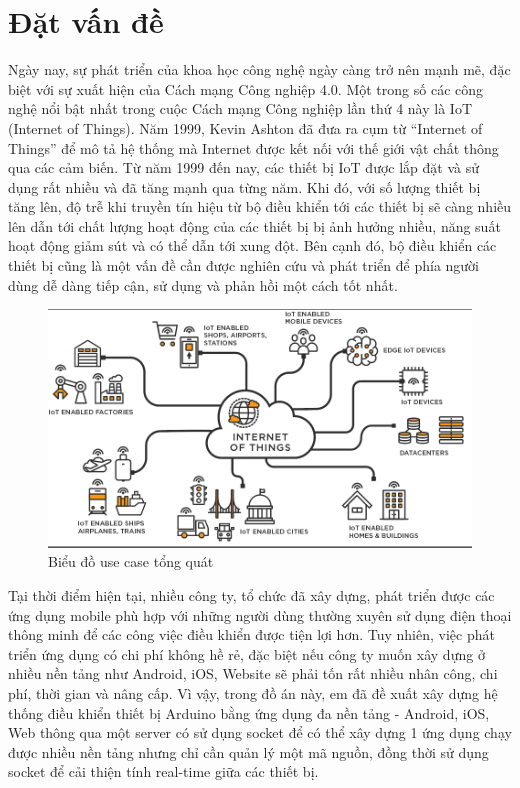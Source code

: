 \documentclass[../DoAn.tex]{subfiles}
\begin{document}
\section{Đặt vấn đề}
\label{section:1.1}

Ngày nay, sự phát triển của khoa học công nghệ ngày càng trở nên mạnh mẽ, đặc biệt với sự xuất hiện của Cách mạng Công nghiệp 4.0. Một trong số các công nghệ nổi bật nhất trong cuộc Cách mạng Công nghiệp lần thứ 4 này là IoT (Internet of Things). Năm 1999, Kevin Ashton \cite{KevinAshton} đã đưa ra cụm từ “Internet of Things” để mô tả hệ thống mà Internet được kết nối với thế giới vật chất thông qua các cảm biến. Từ năm 1999 đến nay, các thiết bị IoT được lắp đặt và sử dụng rất nhiều và đã tăng mạnh qua từng năm. Khi đó, với số lượng thiết bị tăng lên, độ trễ khi truyền tín hiệu từ bộ điều khiển tới các thiết bị sẽ càng nhiều lên dẫn tới chất lượng hoạt động của các thiết bị bị ảnh hưởng nhiều, năng suất hoạt động giảm sút và có thể dẫn tới xung đột. Bên cạnh đó, bộ điều khiển các thiết bị cũng là một vấn đề cần được nghiên cứu và phát triển để phía người dùng dễ dàng tiếp cận, sử dụng và phản hồi một cách tốt nhất. 

\begin{figure}[H]
    \includegraphics[width=0.9\linewidth]{Hinhve/IoT.png}
    \centering
    \caption{Biểu đồ use case tổng quát}
\end{figure}

Tại thời điểm hiện tại, nhiều công ty, tổ chức đã xây dựng, phát triển được các ứng dụng mobile phù hợp với những người dùng thường xuyên sử dụng điện thoại thông minh để các công việc điều khiển được tiện lợi hơn.
Tuy nhiên, việc phát triển ứng dụng có chi phí không hề rẻ, đặc biệt nếu công ty muốn xây dựng ở nhiều nền tảng như Android, iOS, Website sẽ phải tốn rất nhiều nhân công, chi phí, thời gian và nâng cấp. Vì vậy, trong đồ án này, em đã đề xuất xây dựng hệ thống điều khiển thiết bị Arduino bằng ứng dụng đa nền tảng - Android, iOS, Web thông qua một server có sử dụng socket để có thể xây dựng 1 ứng dụng chạy được nhiều nền tảng nhưng chỉ cần quản lý một mã nguồn, đồng thời sử dụng socket để cải thiện tính real-time giữa các thiết bị.
\end{document}
